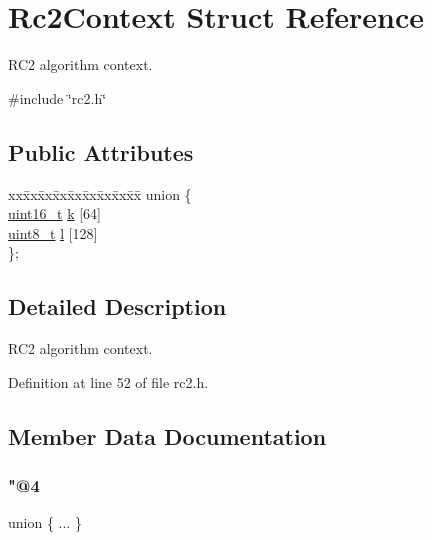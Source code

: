 \hypertarget{structRc2Context}{}\section{Rc2\+Context Struct Reference}
\label{structRc2Context}


R\+C2 algorithm context.  




{\ttfamily \#include \char`\"{}rc2.\+h\char`\"{}}

\subsection*{Public Attributes}
\begin{DoxyCompactItemize}
\item 
\begin{tabbing}
xx\=xx\=xx\=xx\=xx\=xx\=xx\=xx\=xx\=\kill
union \{\\
\>\hyperlink{stdint_8h_a273cf69d639a59973b6019625df33e30}{uint16\_t} \hyperlink{structRc2Context_a5f8fb41c7bc89383e86d498556f010e4}{k} \mbox{[}64\mbox{]}\\
\>\hyperlink{stdint_8h_aba7bc1797add20fe3efdf37ced1182c5}{uint8\_t} \hyperlink{structRc2Context_a4bae73d72c8d515d39d11364a4ff7d99}{l} \mbox{[}128\mbox{]}\\
\}; \\

\end{tabbing}\end{DoxyCompactItemize}


\subsection{Detailed Description}
R\+C2 algorithm context. 

Definition at line 52 of file rc2.\+h.



\subsection{Member Data Documentation}
\mbox{\label{structRc2Context_aee7c05718720d5fa865d1e22f478b478}} 
\subsubsection{\texorpdfstring{"@4}{@4}}
{\footnotesize\ttfamily union \{ ... \} }

